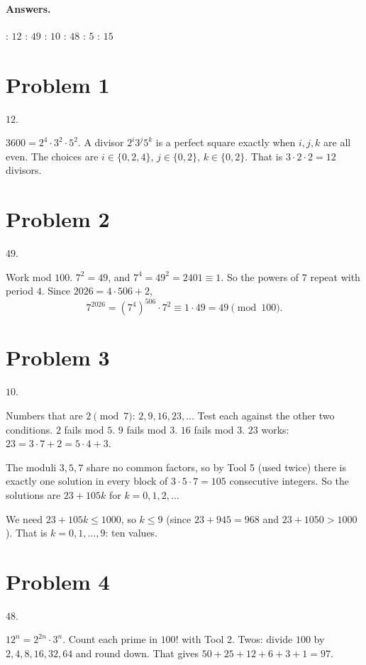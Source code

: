 \documentclass[11pt]{article}
\begin{document}

\paragraph{Answers.} : $12$ : $49$ : $10$ : $48$ : $5$ : $15$

\section*{Problem 1}
\begin{answer} $12$. \end{answer}
$3600 = 2^4 \cdot 3^2 \cdot 5^2$. A divisor $2^i 3^j 5^k$ is a perfect square exactly when $i, j, k$ are all even. The choices are $i \in \{0, 2, 4\}$, $j \in \{0, 2\}$, $k \in \{0, 2\}$. That is $3 \cdot 2 \cdot 2 = 12$ divisors.

\section*{Problem 2}
\begin{answer} $49$. \end{answer}
Work mod $100$. $7^2 = 49$, and $7^4 = 49^2 = 2401 \equiv 1$. So the powers of $7$ repeat with period $4$. Since $2026 = 4 \cdot 506 + 2$,
\[ 7^{2026} = (7^4)^{506} \cdot 7^2 \equiv 1 \cdot 49 = 49 \pmod{100}. \]

\section*{Problem 3}
\begin{answer} $10$. \end{answer}
Numbers that are $2 \pmod 7$: $2, 9, 16, 23, \dots$ Test each against the other two conditions. $2$ fails mod $5$. $9$ fails mod $3$. $16$ fails mod $3$. $23$ works: $23 = 3 \cdot 7 + 2 = 5 \cdot 4 + 3$.

The moduli $3, 5, 7$ share no common factors, so by Tool 5 (used twice) there is exactly one solution in every block of $3 \cdot 5 \cdot 7 = 105$ consecutive integers. So the solutions are $23 + 105k$ for $k = 0, 1, 2, \dots$

We need $23 + 105k \le 1000$, so $k \le 9$ (since $23 + 945 = 968$ and $23 + 1050 > 1000$). That is $k = 0, 1, \dots, 9$: ten values.

\section*{Problem 4}
\begin{answer} $48$. \end{answer}
$12^n = 2^{2n} \cdot 3^n$. Count each prime in $100!$ with Tool 2.
Twos: divide $100$ by $2, 4, 8, 16, 32, 64$ and round down. That gives $50 + 25 + 12 + 6 + 3 + 1 = 97$.
\end{document}
